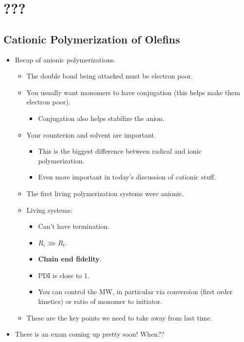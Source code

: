 \documentclass[../notes.tex]{subfiles}
\begin{document}
\chapter{???}
\section{Cationic Polymerization of Olefins}
\begin{itemize}
    \item {}Recap of anionic polymerizations.
    \begin{itemize}
        \item The double bond being attacked must be electron poor.
        \item You usually want monomers to have conjugation (this helps make them electron poor).
        \begin{itemize}
            \item Conjugation also helps stabilize the anion.
        \end{itemize}
        \item Your counterion and solvent are important.
        \begin{itemize}
            \item This is the biggest difference between radical and ionic polymerization.
            \item Even more important in today's discussion of cationic stuff.
        \end{itemize}
        \item The first living polymerization systems were anionic.
        \item Living systems:
        \begin{itemize}
            \item Can't have termination.
            \item $R_i\ggg R_t$.
            \item \textbf{Chain end fidelity}.
            \item PDI is close to 1.
            \item You can control the MW, in particular via conversion (first order kinetics) or ratio of monomer to initiator.
        \end{itemize}
        \item These are the key points we need to take away from last time.
    \end{itemize}
    \item There is an exam coming up pretty soon! When??

\end{itemize}
\end{document}
